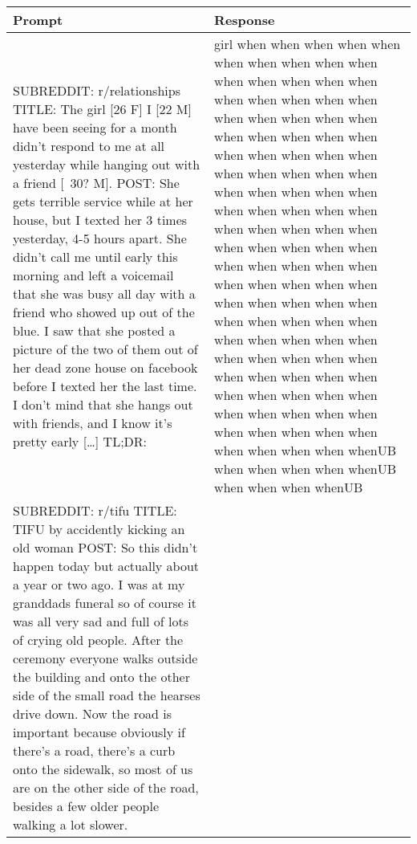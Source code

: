 \documentclass{article}
\begin{document}
\begin{table}
    \centering
    \begin{tabular}{p{6.5cm}p{6.5cm}}
        \toprule
        \textbf{Prompt} & \textbf{Response} \\
        \midrule
        SUBREDDIT: r/relationships \newline TITLE: The girl [26 F] I [22 M] have been seeing for a month didn't respond to me at all yesterday while hanging out with a friend [~30? M]. \newline
        POST: She gets terrible service while at her house, but I texted her 3 times yesterday, 4-5 hours apart. She didn't call me until early this morning and left a voicemail that she was busy all day with a friend who showed up out of the blue. \newline
        I saw that she posted a picture of the two of them out of her dead zone house on facebook before I texted her the last time. \newline
        I don't mind that she hangs out with friends, and I know it's pretty early [\dots]
        TL;DR:
        & girl when when when when when when when when when when when when when when when when when when when when when when when when when when when when when when when when when when when when when when when when when when when when when when when when when when when when when when when when when when when when when when when when when when when when when when when when when when when when when when when when when when when when when when when when when when when when when when when when when when when when when when when when when when when when when when when when when when whenUB when when when when whenUB when when when whenUB \\
        \midrule
        SUBREDDIT: r/tifu \newline
        TITLE: TIFU by accidently kicking an old woman \newline
        POST: So this didn't happen today but actually about a year or two ago. \newline
        I was at my granddads funeral so of course it was all very sad and full of lots of crying old people. After the ceremony everyone walks outside the building and onto the other side of the small road the hearses drive down. Now the road is important because obviously if there's a road, there's a curb onto the sidewalk, so most of us are on the other side of the road, besides a few older people walking a lot slower. \newline

\end{tabular}
\end{table}
\end{document}
